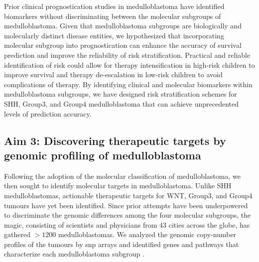Prior clinical prognostication studies in medulloblastoma have identified biomarkers without discriminating between the molecular subgroups of medulloblastoma. Given that medulloblastoma subgroups are biologically and molecularly distinct disease entities, we hypothesized that incorporating molecular subgroup into prognostication can enhance the accuracy of survival prediction and improve the reliability of risk stratification. Practical and reliable identification of risk could allow for therapy intensification in high-risk children to improve survival and therapy de-escalation in low-risk children to avoid complications of therapy. By identifying clinical and molecular biomarkers within medulloblastoma subgroups, we have designed risk stratification schemes for SHH, Group3, and Group4 medulloblastoma that can achieve unprecedented levels of prediction accuracy.

\subsection*{Aim 3: Discovering therapeutic targets by genomic profiling of medulloblastoma}

Following the adoption of the molecular classification of medulloblastoma, we then sought to identify molecular targets in medulloblastoma. Unlike SHH medulloblastomas, actionable therapeutic targets for WNT, Group3, and Group4 tumours have yet been identified. Since prior attempts have been underpowered to discriminate the genomic differences among the four molecular subgroups, the \gls{magic}, consisting of scientists and physicians from 43 cities across the globe, has gathered $>1200$ medulloblastomas. We analyzed the genomic copy-number profiles of the tumours by \gls{snp} arrays and identified genes and pathways that characterize each medulloblastoma subgroup .
